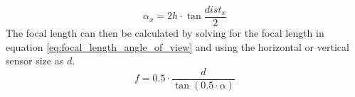 \begin{equation}
\label{eq:angle_of_view_ground_dist}
\alpha_x = 2h\cdot \tan{\frac{dist_x}{2}}
\end{equation}
The focal length can then be calculated by solving for the focal length in equation \eqref{eq:focal_length_angle_of_view} and using the horizontal or vertical sensor size as $d$.
\begin{equation}
\label{eq:focal_length_angle_of_view}
f = 0.5\cdot\frac{d}{\tan{\left(0.5\cdot \alpha\right)}}
\end{equation}
